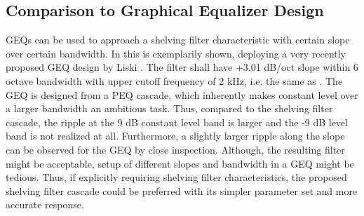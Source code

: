 \subsection{Comparison to Graphical Equalizer Design}
%
GEQs can be used to approach a shelving filter characteristic with
certain slope over certain bandwidth.
%
In  this is exemplarily shown, deploying
a very recently proposed GEQ design by Liski \cite{Liski2019}.
%
The filter shall have +3.01 dB/oct slope within 6 octave bandwidth with upper
cutoff frequency of 2 kHz, i.e. the same as
.
%
The GEQ is designed from a PEQ cascade, which inherently
makes constant level over a larger bandwidth an ambitious task.
%
Thus, compared to the shelving filter cascade, the ripple at the 9 dB constant
level band is larger and the -9 dB level band is not realized at all.
%
Furthermore, a slightly larger ripple along the slope can be observed for the
GEQ by close inspection.
%
Although, the resulting filter might be acceptable, setup of different slopes
and bandwidth in a GEQ might be tedious.
%
Thus, if explicitly requiring shelving filter characteristics,
the proposed shelving filter
cascade could be preferred with its simpler parameter set and more accurate response.

